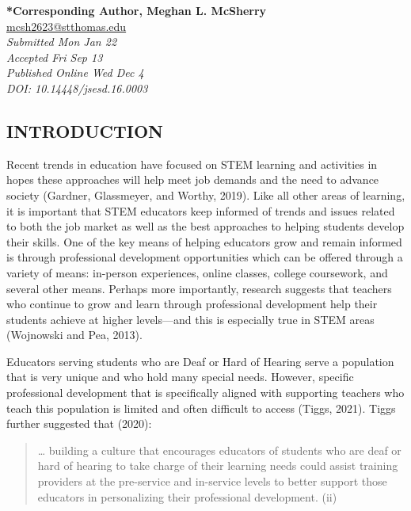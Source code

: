 \documentclass[11.5pt]{sig-alternate} %
\begin{document}
\textbf{*Corresponding Author, Meghan L. McSherry}\\ %
\href{mailto:mcsh2623@stthomas.edu}{mcsh2623@stthomas.edu} \\ %
\textit{Submitted Mon Jan 22} \\ %
\textit{Accepted Fri Sep 13} \\ %
\textit{Published Online Wed Dec 4} \\ %
\textit{DOI: 10.14448/jsesd.16.0003} \\ %
\pagebreak 
\clearpage %

\begin{large}
\section*{INTRODUCTION}

Recent trends in education have focused on STEM learning and activities in hopes these approaches will help meet job demands and the need to advance society (Gardner, Glassmeyer, and Worthy, 2019). Like all other areas of learning, it is important that STEM educators keep informed of trends and issues related to both the job market as well as the best approaches to helping students develop their skills. One of the key means of helping educators grow and remain informed is through professional development opportunities which can be offered through a variety of means: in-person experiences, online classes, college coursework, and several other means. Perhaps more importantly, research suggests that teachers who continue to grow and learn through professional development help their students achieve at higher levels—and this is especially true in STEM areas (Wojnowski and Pea, 2013).

Educators serving students who are Deaf or Hard of Hearing serve a population that is very unique and who hold many special needs. However, specific professional development that is specifically aligned with supporting teachers who teach this population is limited and often difficult to access (Tiggs, 2021). Tiggs further suggested that (2020):

\begin{quote}
    … building a culture that encourages educators of students who are deaf or hard of hearing to take charge of their learning needs could assist training providers at the pre-service and in-service levels to better support those educators in personalizing their professional development. (ii)
\end{quote}


\end{large}
\end{document}
